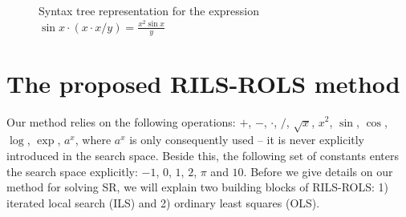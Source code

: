 \documentclass{bmcart}
\begin{document}
	\begin{figure}[!ht]
	\centering
	
	\caption{Syntax tree representation for the expression $\sin{x} \cdot   ( x \cdot  x / y  )  = \frac{x^2 \sin x }{y}$}
	\label{fig:syntax-tree-example}
\end{figure}

	\section{The proposed RILS-ROLS method}\label{sec:rils}

Our method relies on the following operations: $+$, $-$, $\cdot$, $/$, $\sqrt{x}$, $x^2 $, $\sin$, $\cos$, $\log$, $\exp$, $a^x$, where $a^x$ is only consequently used -- it is never explicitly introduced in the search space. Beside this, the following set of constants enters the search space explicitly: $-1$, $0$, $1$, $2$, $\pi$ and $10$. 
Before we give details on our   method for solving SR, we will explain two building blocks of \textsc{RILS-ROLS}: 1) iterated local search (ILS) and 2) ordinary least squares (OLS). 
\end{document}
